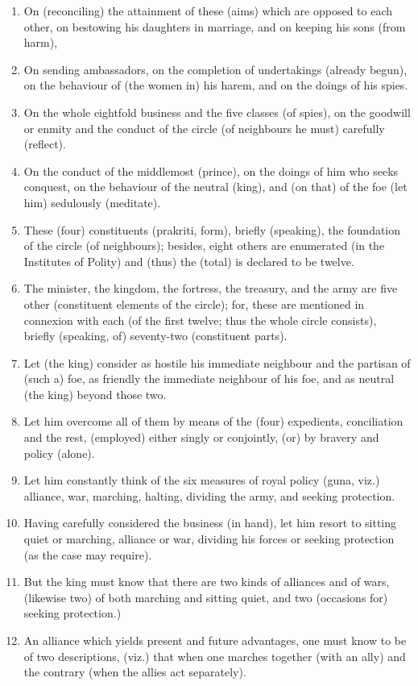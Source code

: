 \begin{enumerate}
\item On (reconciling) the attainment of these (aims) which are opposed to each other, on bestowing his daughters in marriage, and on keeping his sons (from harm),
\item On sending ambassadors, on the completion of undertakings (already begun), on the behaviour of (the women in) his harem, and on the doings of his spies.
\item On the whole eightfold business and the five classes (of spies), on the goodwill or enmity and the conduct of the circle (of neighbours he must) carefully (reflect).
\item On the conduct of the middlemost (prince), on the doings of him who seeks conquest, on the behaviour of the neutral (king), and (on that) of the foe (let him) sedulously (meditate).
\item These (four) constituents (prakriti, form), briefly (speaking), the foundation of the circle (of neighbours); besides, eight others are enumerated (in the Institutes of Polity) and (thus) the (total) is declared to be twelve.
\item The minister, the kingdom, the fortress, the treasury, and the army are five other (constituent elements of the circle); for, these are mentioned in connexion with each (of the first twelve; thus the whole circle consists), briefly (speaking, of) seventy-two (constituent parts).
\item Let (the king) consider as hostile his immediate neighbour and the partisan of (such a) foe, as friendly the immediate neighbour of his foe, and as neutral (the king) beyond those two.
\item Let him overcome all of them by means of the (four) expedients, conciliation and the rest, (employed) either singly or conjointly, (or) by bravery and policy (alone).
\item Let him constantly think of the six measures of royal policy (guna, viz.) alliance, war, marching, halting, dividing the army, and seeking protection.
\item Having carefully considered the business (in hand), let him resort to sitting quiet or marching, alliance or war, dividing his forces or seeking protection (as the case may require).
\item But the king must know that there are two kinds of alliances and of wars, (likewise two) of both marching and sitting quiet, and two (occasions for) seeking protection.)
\item An alliance which yields present and future advantages, one must know to be of two descriptions, (viz.) that when one marches together (with an ally) and the contrary (when the allies act separately).

\end{enumerate}
